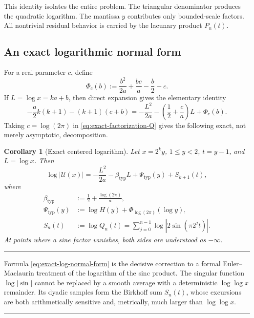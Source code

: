 \documentclass[11pt,oneside]{article}
\newtheorem{corollary}[theorem]{Corollary}
\theoremstyle{definition}
\theoremstyle{remark}
\newcommand{\Uhat}{\mathcal U}
\newenvironment{boxedremark}{%
  \par\smallskip\noindent\begin{center}\begin{minipage}{0.94\textwidth}%
  \color{black}\hrule\vspace{0.6em}\small
}{%
  \vspace{0.6em}\hrule\end{minipage}\end{center}\smallskip
}
\begin{document}
This identity isolates the entire problem.  The triangular denominator produces the
quadratic logarithm.  The mantissa $y$ contributes only bounded-scale factors.  All
nontrivial residual behavior is carried by the lacunary product $P_n(t)$.

\subsection{An exact logarithmic normal form}

For a real parameter $c$, define
\begin{equation}\label{eq:Phi}
 \Phi_c(b):=\frac{b^2}{2a}+\frac{bc}{a}-\frac b2-c.
\end{equation}
If $L=\log x=ka+b$, then direct expansion gives the elementary identity
\begin{equation}\label{eq:algebra-identity}
 -\frac a2k(k+1)-(k+1)(c+b)
 =-\frac{L^2}{2a}
  -\left(\frac12+\frac ca\right)L+\Phi_c(b).
\end{equation}
Taking $c=\log(2\pi)$ in \eqref{eq:exact-factorization-Q} gives the following exact,
not merely asymptotic, decomposition.

\begin{corollary}[Exact centered logarithm]\label{cor:centered-log}
Let $x=2^ky$, $1\le y<2$, $t=y-1$, and $L=\log x$.  Then
\begin{equation}\label{eq:exact-log-normal-form}
 \log|\Uhat(x)|
 =-\frac{L^2}{2a}-\beta_{\mathrm{typ}}L
  +\Psi_{\mathrm{typ}}(y)+S_{k+1}(t),
\end{equation}
where
\begin{align}
 \beta_{\mathrm{typ}}
   &:=\frac12+\frac{\log(2\pi)}{a},\label{eq:beta-typ-def}\\
 \Psi_{\mathrm{typ}}(y)
   &:=\log H(y)+\Phi_{\log(2\pi)}(\log y),\label{eq:Psi-typ}\\
 S_n(t)&:=\log Q_n(t)
 =\sum_{j=0}^{n-1}\log|2\sin(\pi2^jt)|.
 \label{eq:Sn}
\end{align}
At points where a sine factor vanishes, both sides are understood as $-\infty$.
\end{corollary}

\begin{boxedremark}
Formula \eqref{eq:exact-log-normal-form} is the decisive correction to a formal
Euler--Maclaurin treatment of the logarithm of the sinc product.  The singular function
$\log|\sin|$ cannot be replaced by a smooth average with a deterministic
$\log\log x$ remainder.  Its dyadic samples form the Birkhoff sum $S_n(t)$, whose
excursions are both arithmetically sensitive and, metrically, much larger than
$\log\log x$.
\end{boxedremark}
\end{document}
